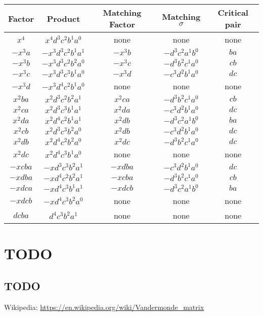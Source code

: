\documentclass[11pt, oneside]{article} 	%
\begin{document}
\begin{center}
\begin{tabular}{||c c c c c||} 
 \hline
 Factor & Product & Matching Factor & Matching $\sigma$ & Critical pair \\ [0.5ex] 
 \hline\hline
 $x^4$ & $x^4d^3c^2b^1a^0$ & none & none & none \\ 
 \hline
 $-x^3a$ & $-x^3d^3c^2b^1a^1$ & $-x^3b$ & $-d^3c^2a^1b^0$ & $ba$ \\ 
 \hline
 $-x^3b$ & $-x^3d^3c^2b^2a^0$ & $-x^3c$ & $-d^3b^2c^1a^0$ & $cb$ \\ 
 \hline
 $-x^3c$ & $-x^3d^3c^3b^1a^0$ & $-x^3d$ & $-c^3d^2b^1a^0$ & $dc$ \\ 
 \hline
 $-x^3d$ & $-x^3d^4c^2b^1a^0$ & none & none & none \\ 
 \hline
 $x^2ba$ & $x^2d^3c^2b^2a^1$ & $x^2ca $& $-d^3b^2c^1a^0$ &  $cb$ \\ 
  \hline
 $x^2ca$ & $x^2d^3c^3b^1a^1$ & $x^2da $& $-c^3d^2b^1a^0$ &  $dc$ \\ 
 \hline
 $x^2da$ & $x^2d^4c^2b^1a^1$ & $x^2db $& $-d^3c^2a^1b^0$ &  $ba$ \\ 

 \hline
 $x^2cb$ & $x^2d^3c^3b^2a^0$ & $x^2db $& $-c^3d^2b^1a^0$ &  $dc$ \\ 
 \hline
 $x^2db$ & $x^2d^4c^2b^2a^0$ & $x^2dc $& $-d^3b^2c^1a^0$ &  $dc$ \\ 
 
 
\hline
 $x^2dc$ & $x^2d^4c^3b^1a^0$ & none & none &  none \\ 
 
 \hline
 $-xcba$ & $-xd^3c^3b^2a^1$ & $-xdba $& $-c^3d^2b^1a^0$ &  $dc$ \\ 

 \hline
 $-xdba$ & $-xd^4c^2b^2a^1$ & $-xcba $& $-d^3b^2c^1a^0$ &  $cb$ \\ 

 \hline
 $-xdca$ & $-xd^4c^3b^1a^1$ & $-xdcb $& $-d^3c^2a^1b^0$ &  $ba$ \\ 

 \hline
 $-xdcb$ & $-xd^4c^3b^2a^0$ & none & none &  none \\ 
 
 
 \hline
 $dcba$ & $ d^4c^3b^2a^1 $ & none & none &  none \\ 
 
 \hline
\end{tabular}
\end{center}


\section{TODO}
\subsection{TODO}

\begin{thebibliography}{9}
Wikipedia: \url{https://en.wikipedia.org/wiki/Vandermonde_matrix}
\end{thebibliography}
\end{document}
